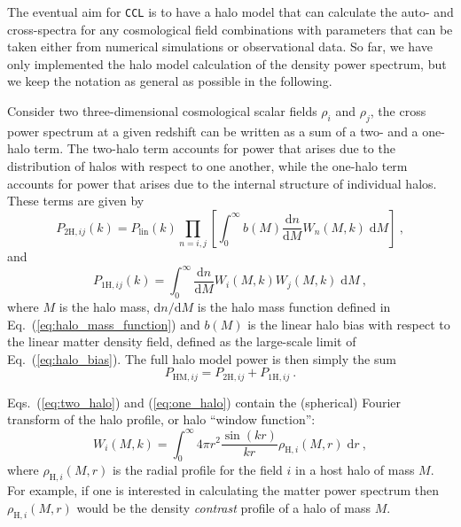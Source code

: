 \documentclass[\docopts]{\docclass}
\newcommand{\ccl}{{\tt CCL}\xspace}
\begin{document}
The eventual aim for \ccl is to have a halo model that can calculate the auto- and cross-spectra for any cosmological field combinations with parameters that can be taken either from numerical simulations or observational data. So far, we have only implemented the halo model calculation of the density power spectrum, but we keep the notation as general as possible in the following.

Consider two three-dimensional cosmological scalar fields $\rho_i$ and $\rho_j$, the cross power spectrum at a given redshift can be written as a sum of a two- and a one-halo term. The two-halo term accounts for power that arises due to the distribution of halos with respect to one another, while the one-halo term accounts for power that arises due to the internal structure of individual halos. These terms are given by
\begin{equation}
P_{2\mathrm{H},ij}(k)=P_{\mathrm{lin}}(k)
\prod_{n=i,j}\left[\int_0^\infty b(M)\frac{\mathrm{d}n}{\mathrm{d}M}W_n(M,k)\;\mathrm{d}M\right]\ ,
\label{eq:two_halo}
\end{equation}
and
\begin{equation}
P_{1\mathrm{H},ij}(k)=\int_0^\infty \frac{\mathrm{d}n}{\mathrm{d}M}W_i(M,k)W_j(M,k)\;\mathrm{d}M\ ,
\label{eq:one_halo}
\end{equation}
where $M$ is the halo mass, $\mathrm{d}n/\mathrm{d}M$ is the halo mass function defined in Eq.~(\ref{eq:halo_mass_function}) and $b(M)$ is the linear halo bias with respect to the linear matter density field, defined as the large-scale limit of Eq.~(\ref{eq:halo_bias}). The full halo model power is then simply the sum
\begin{equation}
P_{\mathrm{HM},ij}=P_{2\mathrm{H},ij}+P_{1\mathrm{H},ij}\ .
\label{eq:halo_model_power}
\end{equation}

Eqs.~(\ref{eq:two_halo}) and (\ref{eq:one_halo}) contain the (spherical) Fourier transform of the halo profile, or halo ``window function'':
\begin{equation} 
W_i(M,k)=\int_0^\infty4\pi r^2\frac{\sin(kr)}{kr}\rho_{\mathrm{H},i}(M,r)\;\mathrm{d}r\ ,
\label{eq:window_function}
\end{equation}
where $\rho_{\mathrm{H},i}(M,r)$ is the radial profile for the field $i$ in a host halo of mass $M$. For example, if one is interested in calculating the matter power spectrum then $\rho_{\mathrm{H},i}(M,r)$ would be the density \emph{contrast} profile of a halo of mass $M$.
\end{document}
